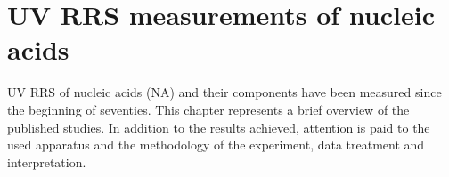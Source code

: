 \section{UV RRS measurements of nucleic acids}

UV RRS of nucleic acids (NA) and their components have been measured since the
beginning of seventies.
This chapter represents a brief overview of the published studies.
In addition to the results achieved, attention is paid to the used apparatus
and the methodology of the experiment, data treatment and interpretation.





